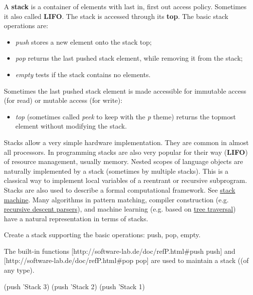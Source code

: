 \begin{itemize}
A \textbf{stack} is a container of elements with last in, first out
access policy. Sometimes it also called \textbf{LIFO}. The stack is
accessed through its \textbf{top}. The basic stack operations are:

\begin{itemize}
\item
  \emph{push} stores a new element onto the stack top;
\item
  \emph{pop} returns the last pushed stack element, while removing it
  from the stack;
\item
  \emph{empty} tests if the stack contains no elements.
\end{itemize}

Sometimes the last pushed stack element is made accessible for immutable
access (for read) or mutable access (for write):

\begin{itemize}
\item
  \emph{top} (sometimes called \emph{peek} to keep with the \emph{p}
  theme) returns the topmost element without modifying the stack.
\end{itemize}

Stacks allow a very simple hardware implementation. They are common in
almost all processors. In programming stacks are also very popular for
their way (\textbf{LIFO}) of resource management, usually memory. Nested
scopes of language objects are naturally implemented by a stack
(sometimes by multiple stacks). This is a classical way to implement
local variables of a reentrant or recursive subprogram. Stacks are also
used to describe a formal computational framework. See
\href{http://en.wikipedia.org/wiki/Stack\_automaton}{stack machine}.
Many algorithms in pattern matching, compiler construction (e.g.
\href{http://en.wikipedia.org/wiki/Recursive\_descent}{recursive descent
parsers}), and machine learning (e.g. based on
\href{http://en.wikipedia.org/wiki/Tree\_traversal}{tree traversal})
have a natural representation in terms of stacks.

Create a stack supporting the basic operations: push, pop, empty.

\begin{wideverbatim}

The built-in functions [http://software-lab.de/doc/refP.html#push push] and
[http://software-lab.de/doc/refP.html#pop pop] are used to maintain a
stack ((of any type).

(push 'Stack 3)
(push 'Stack 2)
(push 'Stack 1)


\end{wideverbatim}
\end{itemize}
